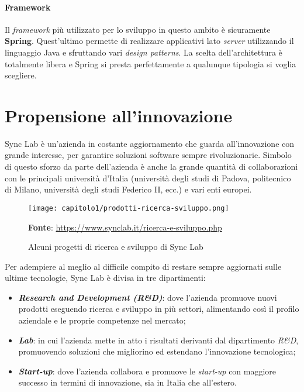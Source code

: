 \paragraph{Framework}
Il \textit{framework} più utilizzato per lo sviluppo in questo ambito è sicuramente \textbf{Spring}. Quest'ultimo permette di realizzare applicativi lato \textit{server} utilizzando il linguaggio Java e sfruttando vari \textit{design patterns}. La scelta dell'architettura è totalmente libera e Spring si presta perfettamente a qualunque tipologia si voglia scegliere.

\section{Propensione all'innovazione}
Sync Lab è un'azienda in costante aggiornamento che guarda all'innovazione con grande interesse, per garantire soluzioni software sempre rivoluzionarie. Simbolo di questo sforzo da parte dell'azienda è anche la grande quantità di collaborazioni con le principali università d'Italia (università degli studi di Padova, politecnico di Milano, università degli studi Federico II, ecc.) e vari enti europei.\\

\begin{figure}[!h]
  \centering
  \texttt{[image: capitolo1/prodotti-ricerca-sviluppo.png]}
  \caption{Alcuni progetti di ricerca e sviluppo di Sync Lab}
  \textbf{Fonte}: \href{https://www.synclab.it/ricerca-e-sviluppo.php}{https://www.synclab.it/ricerca-e-sviluppo.php}
\end{figure}

Per adempiere al meglio al difficile compito di restare sempre aggiornati sulle ultime tecnologie, Sync Lab è divisa in tre dipartimenti:
\begin{itemize}
  \item \textbf{\textit{Research and Development (R\&D)}}: dove l'azienda promuove nuovi prodotti eseguendo ricerca e sviluppo in più settori, alimentando così il profilo aziendale e le proprie competenze nel mercato;
  \item \textbf{\textit{Lab}}: in cui l'azienda mette in atto i risultati derivanti dal dipartimento \textit{R\&D}, promuovendo soluzioni che migliorino ed estendano l'innovazione tecnologica;
  \item \textbf{\textit{Start-up}}: dove l'azienda collabora e promuove le \textit{start-up} con maggiore successo in termini di innovazione, sia in Italia che all'estero.
\end{itemize}  

